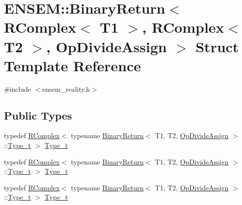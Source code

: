 \hypertarget{structENSEM_1_1BinaryReturn_3_01RComplex_3_01T1_01_4_00_01RComplex_3_01T2_01_4_00_01OpDivideAssign_01_4}{}\section{E\+N\+S\+EM\+:\+:Binary\+Return$<$ R\+Complex$<$ T1 $>$, R\+Complex$<$ T2 $>$, Op\+Divide\+Assign $>$ Struct Template Reference}
\label{structENSEM_1_1BinaryReturn_3_01RComplex_3_01T1_01_4_00_01RComplex_3_01T2_01_4_00_01OpDivideAssign_01_4}


{\ttfamily \#include $<$ensem\+\_\+reality.\+h$>$}

\subsection*{Public Types}
\begin{DoxyCompactItemize}
\item 
typedef \mbox{\hyperlink{classENSEM_1_1RComplex}{R\+Complex}}$<$ typename \mbox{\hyperlink{structENSEM_1_1BinaryReturn}{Binary\+Return}}$<$ T1, T2, \mbox{\hyperlink{structENSEM_1_1OpDivideAssign}{Op\+Divide\+Assign}} $>$\+::\mbox{\hyperlink{structENSEM_1_1BinaryReturn_3_01RComplex_3_01T1_01_4_00_01RComplex_3_01T2_01_4_00_01OpDivideAssign_01_4_af46687e10b8bd51c6624cbfdfd75e9ec}{Type\+\_\+t}} $>$ \mbox{\hyperlink{structENSEM_1_1BinaryReturn_3_01RComplex_3_01T1_01_4_00_01RComplex_3_01T2_01_4_00_01OpDivideAssign_01_4_af46687e10b8bd51c6624cbfdfd75e9ec}{Type\+\_\+t}}
\item 
typedef \mbox{\hyperlink{classENSEM_1_1RComplex}{R\+Complex}}$<$ typename \mbox{\hyperlink{structENSEM_1_1BinaryReturn}{Binary\+Return}}$<$ T1, T2, \mbox{\hyperlink{structENSEM_1_1OpDivideAssign}{Op\+Divide\+Assign}} $>$\+::\mbox{\hyperlink{structENSEM_1_1BinaryReturn_3_01RComplex_3_01T1_01_4_00_01RComplex_3_01T2_01_4_00_01OpDivideAssign_01_4_af46687e10b8bd51c6624cbfdfd75e9ec}{Type\+\_\+t}} $>$ \mbox{\hyperlink{structENSEM_1_1BinaryReturn_3_01RComplex_3_01T1_01_4_00_01RComplex_3_01T2_01_4_00_01OpDivideAssign_01_4_af46687e10b8bd51c6624cbfdfd75e9ec}{Type\+\_\+t}}
\item 
typedef \mbox{\hyperlink{classENSEM_1_1RComplex}{R\+Complex}}$<$ typename \mbox{\hyperlink{structENSEM_1_1BinaryReturn}{Binary\+Return}}$<$ T1, T2, \mbox{\hyperlink{structENSEM_1_1OpDivideAssign}{Op\+Divide\+Assign}} $>$\+::\mbox{\hyperlink{structENSEM_1_1BinaryReturn_3_01RComplex_3_01T1_01_4_00_01RComplex_3_01T2_01_4_00_01OpDivideAssign_01_4_af46687e10b8bd51c6624cbfdfd75e9ec}{Type\+\_\+t}} $>$ \mbox{\hyperlink{structENSEM_1_1BinaryReturn_3_01RComplex_3_01T1_01_4_00_01RComplex_3_01T2_01_4_00_01OpDivideAssign_01_4_af46687e10b8bd51c6624cbfdfd75e9ec}{Type\+\_\+t}}
\end{DoxyCompactItemize}


